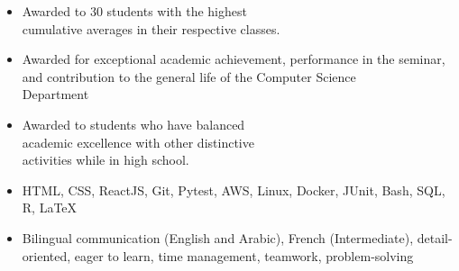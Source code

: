 \documentclass[10pt,a4paper,ragged2e]{altacv}
\begin{document}
\begin{itemize}
  \item Awarded to 30 students with the highest \\ cumulative averages in their respective classes.
\end{itemize}

\begin{itemize}
  \item Awarded for exceptional academic achievement, performance in the
        seminar, and contribution to the general life of the Computer Science \\
        Department
\end{itemize}

\begin{itemize}
  \item Awarded to students who have balanced \\ academic excellence with other
        distinctive \\ activities while in high school.
\end{itemize}



\begin{itemize}
  \item HTML, CSS, ReactJS, Git, Pytest, AWS, Linux, Docker, JUnit, Bash, SQL,
        R, \LaTeX

\end{itemize}
\begin{itemize}
  \item Bilingual communication (English and Arabic), French (Intermediate),
        detail-oriented, eager to learn, time management, teamwork, problem-solving

\end{itemize}








\end{document}
